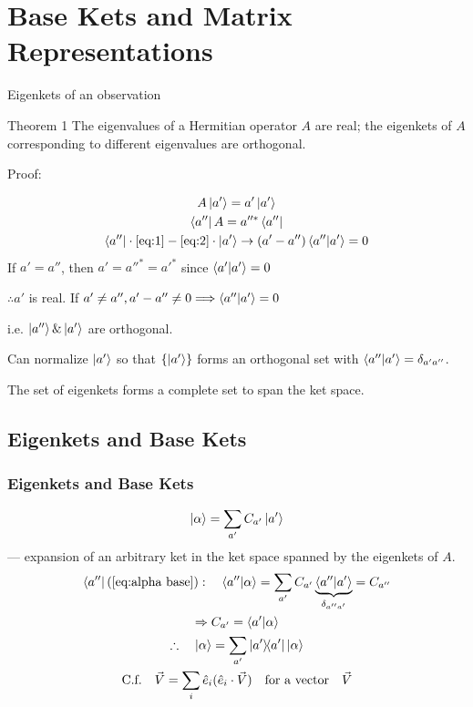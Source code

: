 \section{Base Kets and Matrix Representations}
\begin{frame}{Eigenkets of an observation}
	\begin{alertblock}{Theorem 1}
		The eigenvalues of a Hermitian operator $A$ are real; the eigenkets of $A$ corresponding to different eigenvalues are orthogonal.
	\end{alertblock}
	Proof:

	\begin{gather}
		A\ket{a'} = a'\ket{a'} \label{eq:1}\\
		\bra{a'' }A = a''^* \bra{a''} \label{eq:2}\\
		\bra{a''} \cdot \ref{eq:1} - \ref{eq:2}\cdot \ket{a'} \to (a'-a'') \ip{a''}{a'} = 0
	\end{gather}
	If $a'=a''$, then $a'=a''^*=a'^*$ since $\ip{a'}{a'} = 0$

	$\therefore a'$ is real. If $a'\ne a'', a'-a'' \ne 0 \Longrightarrow \ip{a''}{a'} = 0$

	i.e. $\ket{a''} \& \ket{a'}$ are orthogonal.

\end{frame}
\begin{frame}
	Can normalize $\ket{a'}$ so that $\{\ket{a'}\}$ forms an orthogonal set with $\ip{a''}{a'}= \delta_{a' a''}$.

	The set of eigenkets forms a complete set to span the ket space.
\end{frame}

\subsection{Eigenkets and Base Kets}
\begin{frame}
	\frametitle{Eigenkets and Base Kets}

	\begin{equation}\label{eq:alpha base}
		\ket{\alpha} = \sum_{a'} C_{a'} \ket{a'}
	\end{equation}
	--- expansion of an arbitrary ket in the ket space spanned by the eigenkets of $A$.
	\begin{gather*}
		\bra{a''} (\ref{eq:alpha base}): \quad \ip{a''}{\alpha} = \sum_{a'} C_{a'} \underbrace{\ip{a''}{a'}}_{\delta_{a'' a'}} = C_{a''}\\
		\Rightarrow C_{a'} = \ip{a'}{\alpha}\\
		\therefore \quad \ket{\alpha} = \sum_{a'} \op{a'}\ket{\alpha}\\
		\text{C.f.} \quad \vec{V} = \sum_i \hat e_i (\hat e_i \cdot \vec V) \qq{for a vector} \vec V
	\end{gather*}
\end{frame}


